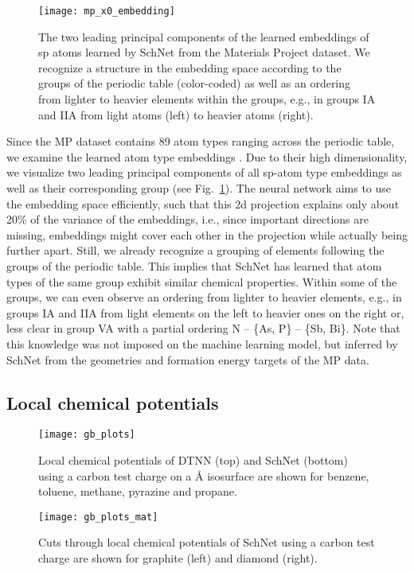 \documentclass[aip,jcp,reprint,graphicx]{revtex4-1}
\begin{document}
\begin{figure}
	\texttt{[image: mp\_x0\_embedding]}
	\caption{\label{fig:x0_mp} The two leading principal components of the learned embeddings  of sp atoms learned by SchNet from the Materials Project dataset. We recognize a structure in the embedding space according to the groups of the periodic table (color-coded) as well as an ordering from lighter to heavier elements within the groups, e.g., in groups IA and IIA from light atoms (left) to heavier atoms (right).}
\end{figure}

Since the MP dataset contains 89 atom types ranging across the periodic table, we examine the learned atom type embeddings .
Due to their high dimensionality, we visualize two leading principal components of all sp-atom type embeddings as well as their corresponding group (see Fig.~\ref{fig:x0_mp}).
The neural network aims to use the embedding space efficiently, such that this 2d projection explains only about 20\% of the variance of the embeddings, i.e., since important directions are missing, embeddings might cover each other in the projection while actually being further apart.
Still, we already recognize a grouping of elements following the groups of the periodic table.
This implies that SchNet has learned that atom types of the same group exhibit similar chemical properties.
Within some of the groups, we can even observe an ordering from lighter to heavier elements, e.g., in groups IA and IIA from light elements on the left to heavier ones on the right or, less clear in group VA with a partial ordering N -- \{As, P\} -- \{Sb, Bi\}.
Note that this knowledge was not imposed on the machine learning model, but inferred by SchNet from the geometries and formation energy targets of the MP data.


\subsection{Local chemical potentials}

\begin{figure*}
	\texttt{[image: gb\_plots]}
	\caption{\label{fig:gbplots} Local chemical potentials  of DTNN (top) and SchNet (bottom) using a carbon test charge on a {\AA} isosurface are shown for benzene, toluene, methane, pyrazine and propane.}
\end{figure*}

\begin{figure}
	\texttt{[image: gb\_plots\_mat]}
	\caption{\label{fig:gbplotsmat} Cuts through local chemical potentials  of SchNet using a carbon test charge are shown for graphite (left) and diamond (right).}
\end{figure}
\end{document}
